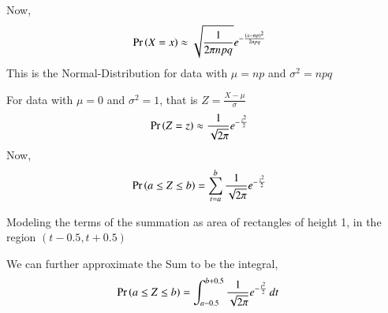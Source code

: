 \documentclass[journal,12pt,twocolumn]{IEEEtran}
\begin{document}
Now,
\begin{align}
    \Pr\left(X=x\right) &\approx \sqrt{\frac{1}{2\pi npq}} e^{-\frac{(x-np)^2}{2npq}}
\end{align}
This is the Normal-Distribution for data with $\mu=np$ and $\sigma^2=npq$

For data with $\mu=0$ and $\sigma^2=1$, that is $Z=\frac{X-\mu}{\sigma}$
\begin{align}
    \Pr\left(Z=z\right) &\approx \frac{1}{\sqrt{2\pi}}e^{-\frac{z^2}{2}}
\end{align}
Now,
\begin{align}
    \Pr\left(a \le Z \le b\right)&= \sum_{t=a}^b \frac{1}{\sqrt{2\pi}}e^{-\frac{z^2}{2}}
\end{align}

Modeling the terms of the summation as area of rectangles of height 1, in the region $(t-0.5,t+0.5)$

We can further approximate the Sum to be the integral,
\begin{align}
    \Pr\left(a \le Z \le b\right)&= \int_{a-0.5}^{b+0.5} \frac{1}{\sqrt{2\pi}}e^{-\frac{t^2}{2}}\,dt\
\end{align}
\end{document}
